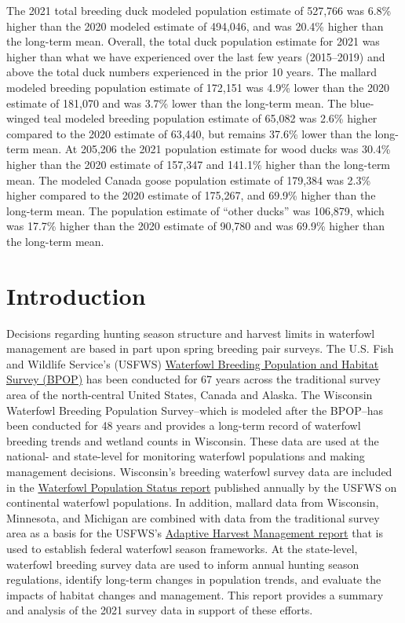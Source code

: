 \documentclass[
  12pt,
]{article}
\begin{document}
The 2021 total breeding duck modeled population estimate of 527,766 was
6.8\% higher than the 2020 modeled estimate of 494,046, and was 20.4\%
higher than the long-term mean. Overall, the total duck population
estimate for 2021 was higher than what we have experienced over the last
few years (2015--2019) and above the total duck numbers experienced in
the prior 10 years. The mallard modeled breeding population estimate of
172,151 was 4.9\% lower than the 2020 estimate of 181,070 and was 3.7\%
lower than the long-term mean. The blue-winged teal modeled breeding
population estimate of 65,082 was 2.6\% higher compared to the 2020
estimate of 63,440, but remains 37.6\% lower than the long-term mean. At
205,206 the 2021 population estimate for wood ducks was 30.4\% higher
than the 2020 estimate of 157,347 and 141.1\% higher than the long-term
mean. The modeled Canada goose population estimate of 179,384 was 2.3\%
higher compared to the 2020 estimate of 175,267, and 69.9\% higher than
the long-term mean. The population estimate of ``other ducks'' was
106,879, which was 17.7\% higher than the 2020 estimate of 90,780 and
was 69.9\% higher than the long-term mean.

\newpage

\hypertarget{introduction}{%
\section{Introduction}\label{introduction}}

Decisions regarding hunting season structure and harvest limits in
waterfowl management are based in part upon spring breeding pair
surveys. The U.S. Fish and Wildlife Service's (USFWS)
\href{https://www.fws.gov/birds/surveys-and-data/population-surveys.php}{Waterfowl
Breeding Population and Habitat Survey (BPOP)} has been conducted for 67
years across the traditional survey area of the north-central United
States, Canada and Alaska. The Wisconsin Waterfowl Breeding Population
Survey--which is modeled after the BPOP--has been conducted for 48 years
and provides a long-term record of waterfowl breeding trends and wetland
counts in Wisconsin. These data are used at the national- and
state-level for monitoring waterfowl populations and making management
decisions. Wisconsin's breeding waterfowl survey data are included in
the
\href{https://www.fws.gov/birds/surveys-and-data/reports-and-publications/population-status.php}{Waterfowl
Population Status report} published annually by the USFWS on continental
waterfowl populations. In addition, mallard data from Wisconsin,
Minnesota, and Michigan are combined with data from the traditional
survey area as a basis for the USFWS's
\href{https://www.fws.gov/birds/management/adaptive-harvest-management/publications-and-reports.php}{Adaptive
Harvest Management report} that is used to establish federal waterfowl
season frameworks. At the state-level, waterfowl breeding survey data
are used to inform annual hunting season regulations, identify long-term
changes in population trends, and evaluate the impacts of habitat
changes and management. This report provides a summary and analysis of
the 2021 survey data in support of these efforts.
\end{document}
